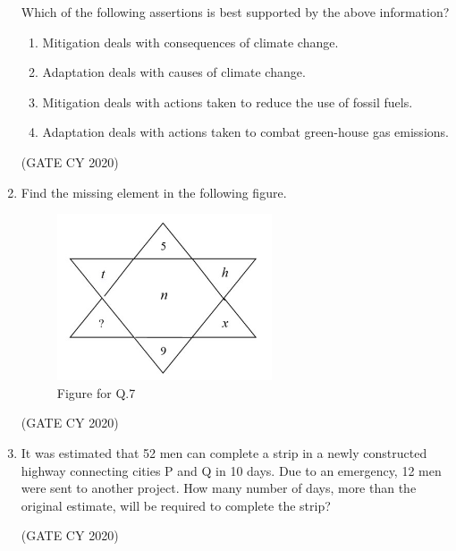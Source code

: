 \documentclass[12pt]{article}
\begin{document}
\begin{enumerate}
Which of the following assertions is best supported by the above information?
\begin{enumerate}
\item Mitigation deals with consequences of climate change.
\item Adaptation deals with causes of climate change.
\item Mitigation deals with actions taken to reduce the use of fossil fuels.
\item Adaptation deals with actions taken to combat green-house gas emissions.
\end{enumerate}
\hfill (GATE CY 2020)

\item Find the missing element in the following figure.

\begin{figure}[H]
\centering
\includegraphics[width=0.4\columnwidth]{figs/q7.png}
\caption{Figure for Q.7}
\label{fig:q7}
\end{figure}
\begin{enumerate}
\end{enumerate}
\hfill (GATE CY 2020)

\item It was estimated that 52 men can complete a strip in a newly constructed highway connecting cities P and Q in 10 days. Due to an emergency, 12 men were sent to another project. How many number of days, more than the original estimate, will be required to complete the strip?
\begin{enumerate}
\end{enumerate}
\hfill (GATE CY 2020)


\end{enumerate}
\end{document}
